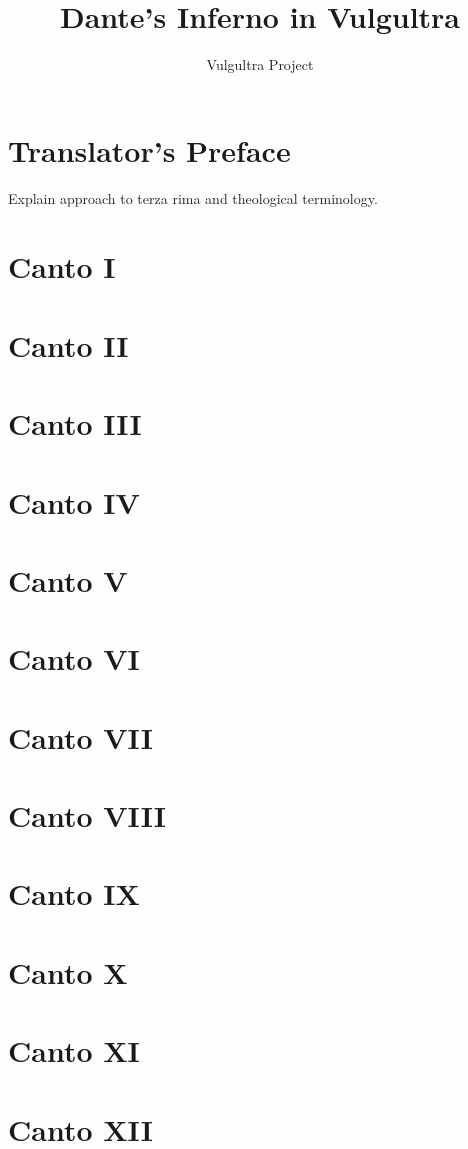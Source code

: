 \documentclass[12pt]{book}
\title{Dante's Inferno in Vulgultra}
\author{Vulgultra Project}
\date{}
\begin{document}
\maketitle
\tableofcontents

\chapter{Translator's Preface}
Explain approach to terza rima and theological terminology.

\chapter{Canto I}
\chapter{Canto II}
\chapter{Canto III}
\chapter{Canto IV}
\chapter{Canto V}
\chapter{Canto VI}
\chapter{Canto VII}
\chapter{Canto VIII}
\chapter{Canto IX}
\chapter{Canto X}
\chapter{Canto XI}
\chapter{Canto XII}
\end{document}
